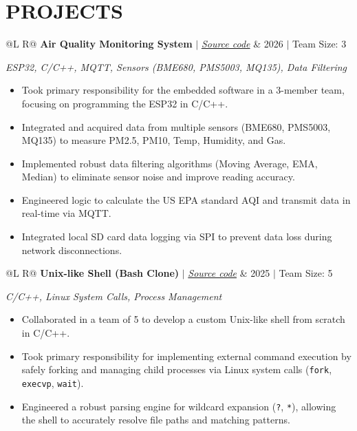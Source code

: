 \documentclass[a4paper,11pt]{article}
\begin{document}

\section{PROJECTS}

\begin{tabularx}{\linewidth}{@{}L R@{}}
\textbf{Air Quality Monitoring System} $|$ \href{https://github.com/nhhoang1510/aqistation}{\textit{Source code}} & 2026 $|$ Team Size: 3 \\
\end{tabularx}
\textit{ESP32, C/C++, MQTT, Sensors (BME680, PMS5003, MQ135), Data Filtering}
\begin{itemize}[nosep, leftmargin=1em, itemsep=2pt, label=--]
    \item Took primary responsibility for the embedded software in a 3-member team, focusing on programming the ESP32 in C/C++.
    \item Integrated and acquired data from multiple sensors (BME680, PMS5003, MQ135) to measure PM2.5, PM10, Temp, Humidity, and Gas.
    \item Implemented robust data filtering algorithms (Moving Average, EMA, Median) to eliminate sensor noise and improve reading accuracy.
    \item Engineered logic to calculate the US EPA standard AQI and transmit data in real-time via MQTT.
    \item Integrated local SD card data logging via SPI to prevent data loss during network disconnections.
\end{itemize}

\vspace{4pt}

\begin{tabularx}{\linewidth}{@{}L R@{}}
\textbf{Unix-like Shell (Bash Clone)} $|$ \href{https://github.com/nhhoang1510/os_project1}{\textit{Source code}} & 2025 $|$ Team Size: 5 \\
\end{tabularx}
\textit{C/C++, Linux System Calls, Process Management}
\begin{itemize}[nosep, leftmargin=1em, itemsep=2pt, label=--]
    \item Collaborated in a team of 5 to develop a custom Unix-like shell from scratch in C/C++.
    \item Took primary responsibility for implementing external command execution by safely forking and managing child processes via Linux system calls (\texttt{fork}, \texttt{execvp}, \texttt{wait}).
    \item Engineered a robust parsing engine for wildcard expansion (\texttt{?}, \texttt{*}), allowing the shell to accurately resolve file paths and matching patterns.
\end{itemize}
\end{document}
